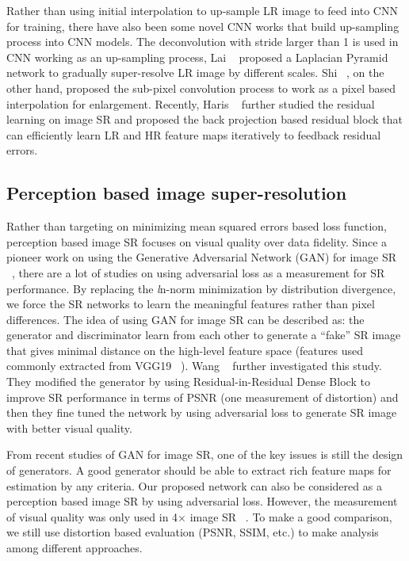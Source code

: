 \documentclass[10pt,twocolumn,letterpaper]{article}
\begin{document}
Rather than using initial interpolation to up-sample LR image to feed into CNN for training, there have also been some novel CNN works that build up-sampling process into CNN models. The deconvolution with stride larger than 1 is used in CNN working as an up-sampling process, Lai \etal ~\cite{LapSRN} proposed a Laplacian Pyramid network to gradually super-resolve LR image by different scales. Shi \etal ~\cite{ESPCN}, on the other hand, proposed the sub-pixel convolution process to work as a pixel based interpolation for enlargement. Recently, Haris \etal ~\cite{DBPN} further studied the residual learning on image SR and proposed the back projection based residual block that can efficiently learn LR and HR feature maps iteratively to feedback residual errors. 

\subsection{Perception based image super-resolution}
Rather than targeting on minimizing mean squared errors based loss function, perception based image SR focuses on visual quality over data fidelity. Since a pioneer work on using the Generative Adversarial Network (GAN) for image SR ~\cite{SRGAN}, there are a lot of studies on using adversarial loss as a measurement for SR performance. By replacing the \textit{l}n-norm minimization by distribution divergence, we force the SR networks to learn the meaningful features rather than pixel differences. The idea of using GAN for image SR can be described as: the generator and discriminator learn from each other to generate a ``fake'' SR image that gives minimal distance on the high-level feature space (features used commonly extracted from VGG19 ~\cite{VGG}). Wang \etal ~\cite{ESRGAN} further investigated this study. They modified the generator by using Residual-in-Residual Dense Block to improve SR performance in terms of PSNR (one measurement of distortion) and then they fine tuned the network by using adversarial loss to generate SR image with better visual quality.

From recent studies of GAN for image SR, one of the key issues is still the design of generators. A good generator should be able to extract rich feature maps for estimation by any criteria. Our proposed network can also be considered as a perception based image SR by using adversarial loss. However, the measurement of visual quality was only used in 4$\times$ image SR ~\cite{SRGAN,EnhanceNet,ESRGAN}. To make a good comparison, we still use distortion based evaluation (PSNR, SSIM, etc.) to make analysis among different approaches.
\end{document}
